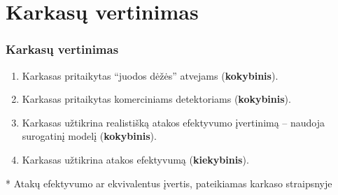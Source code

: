 \section{Karkasų vertinimas}
\begin{frame}
    \frametitle{Karkasų vertinimas}
    \begin{enumerate}[K-1.]
        \item Karkasas pritaikytas \enquote{juodos dėžės} atvejams
              (\textbf{kokybinis}).\pause
        \item Karkasas pritaikytas komerciniams detektoriams (\textbf{kokybinis}).\pause
        \item Karkasas užtikrina realistišką atakos efektyvumo įvertinimą -- naudoja
              surogatinį modelį (\textbf{kokybinis}).\pause
        \item Karkasas užtikrina atakos efektyvumą (\textbf{kiekybinis}).
    \end{enumerate}\pause

    \begin{criteriaTable}
    \end{criteriaTable}
    \footnotesize{* Atakų efektyvumo ar ekvivalentus įvertis, pateikiamas karkaso straipsnyje}

\end{frame}

